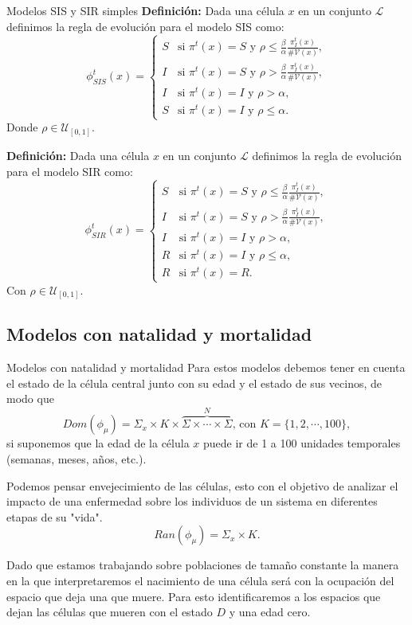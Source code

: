 \documentclass[9pt]{beamer}
\begin{document}
\begin{frame}{Modelos SIS y SIR simples}
\textbf{Definición:} Dada una célula $x$ en un conjunto $\mathcal{L}$ definimos la regla de evolución para el modelo SIS como:
\begin{equation}
    \phi_{SIS}^t(x)=\left\{\begin{array}{ll}
        S & \text{si }\pi^t(x)=S\text{ y }\rho\leq\frac{\beta}{\alpha}\frac{\pi_I^t(x)}{\#\mathcal{V}(x)}, \\
        I & \text{si }\pi^t(x)=S\text{ y }\rho>\frac{\beta}{\alpha}\frac{\pi_I^t(x)}{\#\mathcal{V}(x)}, \\
        I & \text{si }\pi^t(x)=I\text{ y }\rho>\alpha,\\
        S & \text{si }\pi^t(x)=I\text{ y }\rho\leq\alpha.
    \end{array}\right.
\end{equation}
Donde $\rho\in\mathcal{U}_{[0,1]}$.
    
\textbf{Definición:} Dada una célula $x$ en un conjunto $\mathcal{L}$ definimos la regla de evolución para el modelo SIR como:
\begin{equation}
    \phi_{SIR}^t(x)=\left\{\begin{array}{ll}
        S & \text{si }\pi^t(x)=S\text{ y }\rho\leq\frac{\beta}{\alpha}\frac{\pi_I^t(x)}{\#\mathcal{V}(x)}, \\
        I & \text{si }\pi^t(x)=S\text{ y }\rho>\frac{\beta}{\alpha}\frac{\pi_I^t(x)}{\#\mathcal{V}(x)}, \\
        I & \text{si }\pi^t(x)=I\text{ y }\rho>\alpha,\\
        R & \text{si }\pi^t(x)=I\text{ y }\rho\leq\alpha, \\
        R & \text{si }\pi^t(x)=R.
    \end{array}\right.
\end{equation}
Con $\rho\in\mathcal{U}_{[0,1]}$.
\end{frame}

\subsection{Modelos con natalidad y mortalidad}
\begin{frame}{Modelos con natalidad y mortalidad}
Para estos modelos debemos tener en cuenta el estado de la célula central junto con su edad y el estado de sus vecinos, de modo que 
$$Dom(\phi_\mu)=\Sigma_x\times K\times\overbrace{\Sigma\times\cdots\times\Sigma}^N\text{, con }K=\{1,2,\cdots,100\},$$
si suponemos que la edad de la célula $x$ puede ir de 1 a 100 unidades temporales (semanas, meses, años, etc.).

Podemos pensar envejecimiento de las células, esto con el objetivo de analizar el impacto de una enfermedad sobre los individuos de un sistema en diferentes etapas de su "vida". 
$$Ran(\phi_\mu)=\Sigma_x\times K.$$

Dado que estamos trabajando sobre poblaciones de tamaño constante la manera en la que interpretaremos el nacimiento de una célula será con la ocupación del espacio que deja una que muere. Para esto identificaremos a los espacios que dejan las células que mueren con el estado $D$ y una edad cero.
\end{frame}
\end{document}
